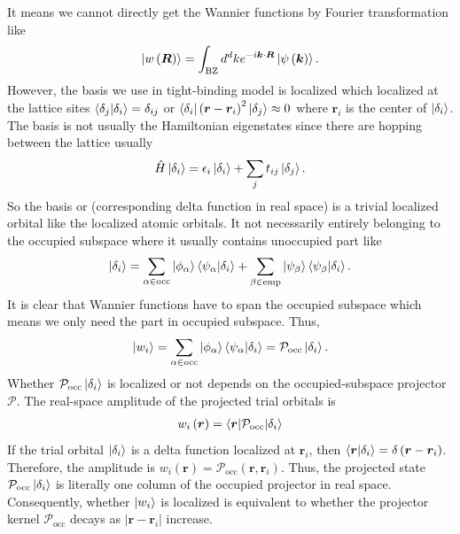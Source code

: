 \documentclass[12pt, oneside]{article}
\newcommand{\mr}[1]{\mathrm{#1}}
\newcommand{\p}[1]{\left(#1\right)}
\numberwithin{equation}{subsection}
\begin{document}
It means we cannot directly get the Wannier functions by Fourier transformation like 
\begin{align}
	\ket{w \p{\bm{R}}} = \int_{\mr{BZ}} d^{d} k e^{-i \bm{k} \cdot \bm{R} } \ket{\psi \p{\bm{k}}}.
\end{align}
However, the basis we use in tight-binding model is localized which localized at the lattice sites \(\braket{\delta_j | \delta_i} = \delta_{ij}\) or \(\braket{\delta_i | \p{\bm{r} - \bm{r}_i}^2 | \delta_{j}} \approx 0\) where \(\bm{r}_i\) is the center of \(\ket{\delta_i}\). The basis is not usually the Hamiltonian eigenstates since there are hopping between the lattice usually
\begin{align}
	\hat{H} \ket{\delta_i} = \epsilon_{i} \ket{\delta_i} + \sum_{j} t_{ij} \ket{\delta_j}.
\end{align}
So the basis or (corresponding delta function in real space) is a trivial localized orbital like the localized atomic orbitals. It not necessarily entirely belonging to the occupied subspace where it usually contains unoccupied part like 
\begin{align}
	\ket{\delta_{i}} = \sum_{\alpha \in \mr{occ}} \ket{\phi_{\alpha}} \braket{\psi_{\alpha} | \delta_{i} } + \sum_{\beta \in \mr{emp}} \ket{\psi_{\beta}} \braket{\psi_{\beta} | \delta_{i}}.
\end{align}
It is clear that Wannier functions have to span the occupied subspace which means we only need the part in occupied subspace. Thus, 
\begin{align}
	\ket{w_i} = \sum_{\alpha \in \mr{occ}}  \ket{\phi_{\alpha}} \braket{\psi_{\alpha} | \delta_{i} } = \mathcal{P}_{\mr{occ}} \ket{\delta_i}.
\end{align}
Whether \(\mathcal{P}_{\mr{occ}} \ket{\delta_i}\) is localized or not depends on the occupied-subspace projector \(\mathcal{P}\). The real-space amplitude of the projected trial orbitals is 
\begin{align}
    w_{i} \p{\bm{r}} = \braket{\bm{r} | \mathcal{P}_{\mr{occ}} |\delta_{i}}
\end{align}
If the trial orbital \(\ket{\delta_i}\) is a delta function localized at \(\bm{r}_i\), then \(\braket{\bm{r} | \delta_i} = \delta \p{\bm{r} - \bm{r}_i}\). Therefore, the amplitude is \(w_i \p{\bm{r}} = \mathcal{P}_\mr{occ} \p{\bm{r}, \bm{r}_i}\). Thus, the projected state \(\mathcal{P}_\mathrm{occ} \ket{\delta_i}\) is literally one column of the occupied projector in real space. Consequently, whether \(\ket{w_i}\) is localized is equivalent to whether the projector kernel \(\mathcal{P}_{\mathrm{occ}}\)  decays as \(\left|\bm{r}-\bm{r}_{i}\right|\) increase.
\end{document}
